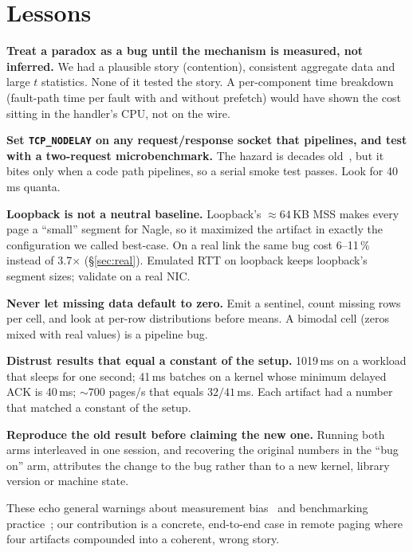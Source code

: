 \documentclass[conference]{IEEEtran}
\newcommand{\nd}{\texttt{TCP\_NODELAY}\xspace}
\begin{document}
\section{Lessons}
\label{sec:lessons}

\textbf{Treat a paradox as a bug until the mechanism is measured, not
inferred.} We had a plausible story (contention), consistent aggregate data
and large $t$ statistics. None of it tested the story. A per-component time
breakdown (fault-path time per fault with and without prefetch) would have
shown the cost sitting in the handler's CPU, not on the wire.

\textbf{Set \nd on any request/response socket that pipelines, and test with
a two-request microbenchmark.} The hazard is decades old~\cite{minshall2000pitfalls,
mogul2001rethinking}, but it bites only when a code path pipelines, so a
serial smoke test passes. Look for 40\,ms quanta.

\textbf{Loopback is not a neutral baseline.} Loopback's ${\approx}64$\,KB MSS
makes every page a ``small'' segment for Nagle, so it maximized the artifact
in exactly the configuration we called best-case. On a real link the same bug
cost 6--11\,\% instead of 3.7$\times$ (\S\ref{sec:real}). Emulated RTT on
loopback keeps loopback's segment sizes; validate on a real NIC.

\textbf{Never let missing data default to zero.} Emit a sentinel, count
missing rows per cell, and look at per-row distributions before means. A
bimodal cell (zeros mixed with real values) is a pipeline bug.

\textbf{Distrust results that equal a constant of the setup.} 1019\,ms on a
workload that sleeps for one second; 41\,ms batches on a kernel whose
minimum delayed ACK is 40\,ms; ${\sim}700$ pages/s that equals $32/41$\,ms.
Each artifact had a number that matched a constant of the setup.

\textbf{Reproduce the old result before claiming the new one.} Running both
arms interleaved in one session, and recovering the original numbers in the
``bug on'' arm, attributes the change to the bug rather than to a new
kernel, library version or machine state.

These echo general warnings about measurement bias~\cite{mytkowicz2009wrong}
and benchmarking practice~\cite{hoefler2015scientific,vanderkouwe2019sok};
our contribution is a concrete, end-to-end case in remote paging where four
artifacts compounded into a coherent, wrong story.

\end{document}
